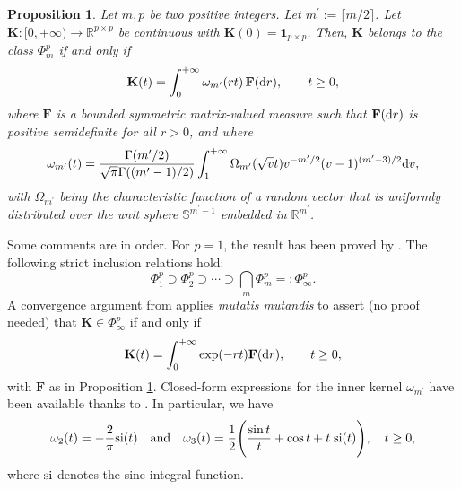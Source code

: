 \documentclass[12pt]{article}
\theoremstyle{plain}
\newtheorem{proposition}{Proposition}
\theoremstyle{remark}
\newcommand{\latMatr}[1]{\mathbf{#1}}          %
\begin{document}
\begin{proposition} 
    \label{prop:p-Schoen}
    Let $m,p$ be two positive integers. {Let $m^\prime:=\lceil m/2 \rceil$.} Let ${\latMatr{K}}: [0,+\infty) \to \mathbb{R}^{p \times p}$ be continuous with ${\latMatr{K}}(0)= \mathbf{1}_{p \times p}$. Then, ${\latMatr{K}}$ belongs to the class $\Phi_m^p$ if and only if 
    \begin{equation}
        \label{eq:alpha-1} {\latMatr{K}}(t) = \int_0^{+\infty} \omega_{{m^\prime}} (rt ) \,{\latMatr{F}}({\rm d}r), \qquad t \ge 0,
    \end{equation}
    where ${\latMatr{F}}$ is a {bounded} {symmetric} matrix-valued measure such that ${\mathbf{F}} ({\rm d}r)$ is positive {semi}definite for all $r >0$, and where 
    \begin{equation}
        \label{eq:omega}
        \omega_{{m^\prime}}(t) = \frac{\Gamma({m^\prime}/2)}{\sqrt{\pi} \Gamma(({m^\prime}-1)/2)} \int_{1}^{+\infty} \Omega_{{m^\prime}} (\sqrt{v}t) v^{-{m^\prime}/2} (v-1)^{({m^\prime}-3)/2} {\rm d} v,  
    \end{equation}
   with $\Omega_{{m^\prime}}$ being the characteristic function of a random vector that is uniformly distributed over the {unit sphere} $\mathbb{S}^{{m^\prime}-1}$ embedded in $\mathbb{R}^{{m^\prime}}$.
\end{proposition}
Some comments are in order. For $p=1$, the result has been proved by \cite{cambanis1983symmetric}. The following strict inclusion relations hold: 
$$ \Phi_{1}^p \supset \Phi_2^p \supset \cdots \supset \bigcap_{m} \Phi_m^p =: \Phi_{\infty}^p.    $$
A convergence argument from \cite{schoenberg} applies \emph{mutatis mutandis} to assert (no proof needed) that ${\mathbf{K}} \in \Phi_{\infty}^p$ if and only if 
\begin{equation}
    \label{eq:alpha-2} {\mathbf{K}}(t) = \int_0^{+\infty} \exp(-rt) {\mathbf{F}}({\rm d}r), \qquad t \ge 0,
\end{equation}
with ${\mathbf{F}}$ as in Proposition \ref{prop:p-Schoen}. Closed-form expressions for the inner kernel $\omega_{{m^\prime}}$ have been available thanks to  \cite{gneiting1998onalpha}. In particular, we have 
\begin{equation*}
    \omega_2(t) = - \frac{2}{\pi} {\rm si}(t) \quad \text{and} \quad \omega_3(t) = \frac{1}{2} \Bigg (  \frac{\sin t}{t} + \cos t + t \; {\rm si}(t)  \Bigg ), \quad t \ge 0, 
\end{equation*}
where ${\rm si}$ denotes the sine integral function. %
\end{document}
